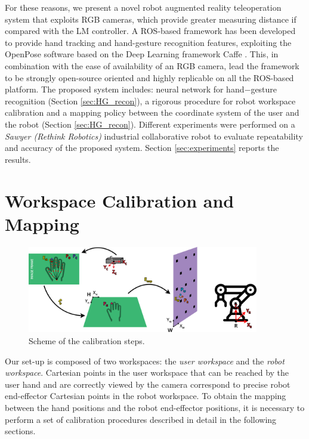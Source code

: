 \documentclass[letterpaper, 10 pt, conference]{ieeeconf}  %
\begin{document}
For these reasons, we present a novel robot augmented reality teleoperation system that exploits RGB cameras, which provide greater measuring distance if compared with the LM controller. A ROS-based framework has been developed to provide hand tracking and hand-gesture recognition features, exploiting the OpenPose software \cite{simon2017hand, cao2018openpose} based on the Deep Learning framework Caffe \cite{jia2014caffe}.
This, in combination with the ease of availability of an RGB camera, lead the framework to be strongly open-source oriented and highly replicable on all the ROS-based platform. The proposed system includes: neural network for hand$-$gesture recognition (Section \ref{sec:HG_recon}), a rigorous procedure for robot workspace calibration and a mapping policy between the coordinate system of the user and the robot (Section \ref{sec:HG_recon}). 
Different experiments were performed on a \textit{Sawyer (Rethink Robotics)} industrial collaborative robot to evaluate repeatability and accuracy of the proposed system. Section \ref{sec:experiments} reports the results.

\section{Workspace Calibration and Mapping} \label{sec:calib}

\begin{figure}[h]
\centering
  \includegraphics[width=0.9\textwidth]{figures/horizcalib.png}
  \caption{Scheme of the calibration steps.}
  \label{fig:wscalib}
\end{figure}

Our set-up is composed of two workspaces: the \textit{user workspace} and the \textit{robot workspace}. Cartesian points in the user workspace that can be reached by the user hand and are correctly viewed by the camera correspond to precise robot end-effector Cartesian points in the robot workspace. To obtain the mapping between the hand positions and the robot end-effector positions, it is necessary to perform a set of calibration procedures described in detail in the following sections.
\end{document}

